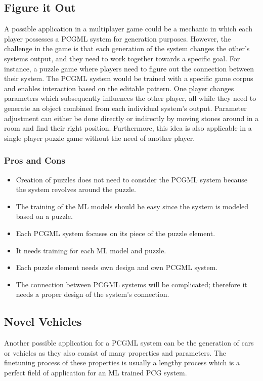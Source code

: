 \documentclass[MGS,Master,english]{twbook}%
\begin{document}
\subsection{Figure it Out} \label{idea::figureItOut}
A possible application in a multiplayer game could be a mechanic in which each player possesses a PCGML system for generation purposes. However, the challenge in the game is that each generation of the system changes the other’s systems output, and they need to work together towards a specific goal. For instance, a puzzle game where players need to figure out the connection between their system. The PCGML system would be trained with a specific game corpus and enables interaction based on the editable pattern. One player changes parameters which subsequently influences the other player, all while they need to generate an object combined from each individual system's output. Parameter adjustment can either be done directly or indirectly by moving stones around in a room and find their right position. Furthermore, this idea is also applicable in a single player puzzle game without the need of another player.

\subsubsection{Pros and Cons}
\begin{itemize}
	\item Creation of puzzles does not need to consider the PCGML system because the system revolves around the puzzle.
	\item The training of the ML models should be easy since the system is modeled based on a puzzle. 
	\item Each PCGML system focuses on its piece of the puzzle element.
	\item It needs training for each ML model and puzzle.
	\item Each puzzle element needs own design and own PCGML system.
	\item The connection between PCGML systems will be complicated; therefore it needs a proper design of the system’s connection.
\end{itemize}


\subsection{Novel Vehicles} \label{idea::novelCars}
Another possible application for a PCGML system can be the generation of cars or vehicles as they also consist of many properties and parameters. The finetuning process of these properties is usually a lengthy process which is a perfect field of application for an ML trained PCG system.
\end{document}
